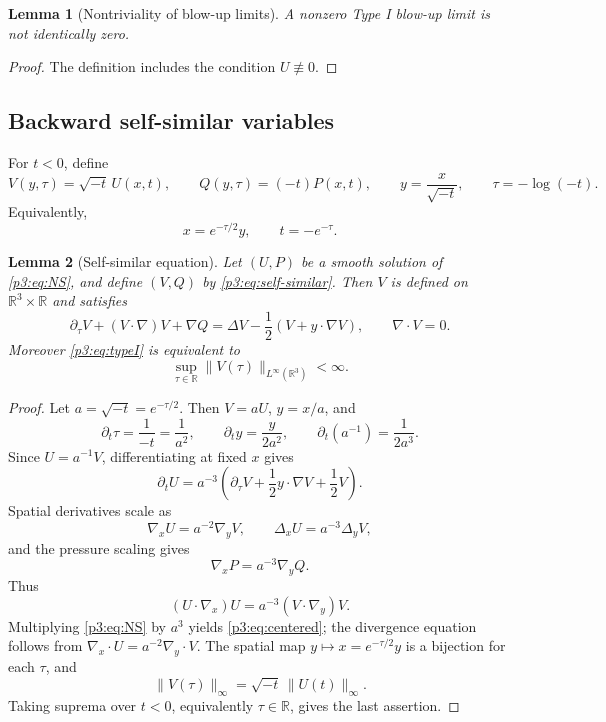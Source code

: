 \documentclass[11pt]{amsart}
\theoremstyle{plain}
\newtheorem{lemma}[lemma]{Lemma}
\theoremstyle{definition}
\theoremstyle{remark}
\numberwithin{equation}{section}
\begin{document}
\begin{lemma}[Nontriviality of blow-up limits]
\label{p3:lem:nonzero-typeI-limit}
   A nonzero Type I blow-up limit is not identically zero.
\end{lemma}

\begin{proof}
The definition includes the condition \(U\not\equiv0\).
\end{proof}

\subsection{Backward self-similar variables}

For \(t<0\), define
\begin{equation}\label{p3:eq:self-similar}
   V(y,\tau)=\sqrt{-t}\,U(x,t),\qquad
   Q(y,\tau)=(-t)P(x,t),\qquad
   y=\frac{x}{\sqrt{-t}},\qquad
   \tau=-\log(-t).
\end{equation}
Equivalently,
\[
   x=e^{-\tau/2}y,\qquad t=-e^{-\tau}.
\]

\begin{lemma}[Self-similar equation]\label{p3:lem:self-similar-equation}
Let \((U,P)\) be a smooth solution of \eqref{p3:eq:NS}, and define \((V,Q)\) by
\eqref{p3:eq:self-similar}.  Then \(V\) is defined on
\(\mathbb R^3\times\mathbb R\) and satisfies
\begin{equation}\label{p3:eq:centered}
   \partial_\tau V+(V\cdot\nabla)V+\nabla Q
   =
   \Delta V-\frac12(V+y\cdot\nabla V),
   \qquad \nabla\cdot V=0.
\end{equation}
Moreover \eqref{p3:eq:typeI} is equivalent to
\[
   \sup_{\tau\in\mathbb R}
   \|V(\tau)\|_{L^\infty(\mathbb R^3)}<\infty .
\]
\end{lemma}

\begin{proof}
Let \(a=\sqrt{-t}=e^{-\tau/2}\).  Then \(V=aU\), \(y=x/a\), and
\[
   \partial_t\tau=\frac1{-t}=\frac1{a^2},
   \qquad
   \partial_t y=\frac{y}{2a^2},
   \qquad
   \partial_t(a^{-1})=\frac1{2a^3}.
\]
Since \(U=a^{-1}V\), differentiating at fixed \(x\) gives
\[
   \partial_tU
   =
   a^{-3}
   \left(
      \partial_\tau V+\frac12 y\cdot\nabla V+\frac12V
   \right).
\]
Spatial derivatives scale as
\[
   \nabla_xU=a^{-2}\nabla_yV,\qquad
   \Delta_xU=a^{-3}\Delta_yV,
\]
and the pressure scaling gives
\[
   \nabla_xP=a^{-3}\nabla_yQ.
\]
Thus
\[
   (U\cdot\nabla_x)U=a^{-3}(V\cdot\nabla_y)V.
\]
Multiplying \eqref{p3:eq:NS} by \(a^3\) yields \eqref{p3:eq:centered}; the
divergence equation follows from
\(\nabla_x\cdot U=a^{-2}\nabla_y\cdot V\).  The spatial map
\(y\mapsto x=e^{-\tau/2}y\) is a bijection for each \(\tau\), and
\[
   \|V(\tau)\|_\infty
   =
   \sqrt{-t}\,\|U(t)\|_\infty .
\]
Taking suprema over \(t<0\), equivalently \(\tau\in\mathbb R\), gives the
last assertion.
\end{proof}
\end{document}
